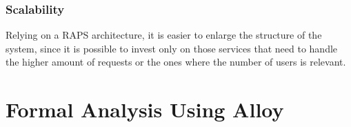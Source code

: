 \documentclass[12pt,a4paper]{article}
\begin{document}
	\subsubsection{Scalability}
	Relying on a RAPS architecture, it is easier to enlarge the structure of the system, since it is possible to invest only on those services that need to handle the higher amount of requests or the ones where the number of users is relevant.
	
	
	\newpage
	\section{Formal Analysis Using Alloy}

	\newpage
	
\end{document}
